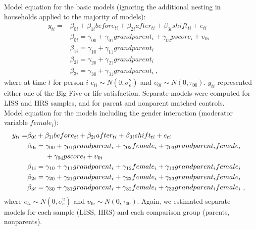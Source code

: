 \documentclass[
  english,
  man, noextraspace]{apa7}
\begin{document}
\begin{appendix}
Model equation for the basic models (ignoring the additional nesting in
households applied to the majority of models): \begin{equation}
\begin{split}
y_{ti} =& \beta_{0i} + \beta_{1i}before_{ti} + \beta_{2i}after_{ti} + \beta_{3i}shift_{ti} + e_{ti} \\
& \beta_{0i} = \gamma_{00} + \gamma_{01}grandparent_i + \gamma_{02}pscore_i + \upsilon_{0i} \\
& \beta_{1i} = \gamma_{10} + \gamma_{11}grandparent_i \\
& \beta_{2i} = \gamma_{20} + \gamma_{21}grandparent_i \\
& \beta_{3i} = \gamma_{30} + \gamma_{31}grandparent_i\ ,
\end{split}
\label{eq:mlm1}
\end{equation} where at time \(t\) for person \(i\)
\(e_{ti} \sim N(0, \sigma_e^2)\) and
\(\upsilon_{0i} \sim N(0, \tau_{00})\). \(y_{ti}\) represented either
one of the Big Five or life satisfaction. Separate models were computed
for LISS and HRS samples, and for parent and nonparent matched
controls.\\
Model equation for the models including the gender interaction
(moderator variable \(female_i\)): \begin{equation}
\begin{split}
y_{ti} =& \beta_{0i} + \beta_{1i}before_{ti} + \beta_{2i}after_{ti} + \beta_{3i}shift_{ti} + e_{ti} \\
& \beta_{0i} = \gamma_{00} + \gamma_{01}grandparent_i + \gamma_{02}female_i + \gamma_{03}grandparent_{i}female_{i} \\
& \hphantom{{}=\beta_{0i}}+ \gamma_{04}pscore_i + \upsilon_{0i} \\
& \beta_{1i} = \gamma_{10} + \gamma_{11}grandparent_i + \gamma_{12}female_i + \gamma_{13}grandparent_{i}female_{i} \\
& \beta_{2i} = \gamma_{20} + \gamma_{21}grandparent_i + \gamma_{22}female_i + \gamma_{23}grandparent_{i}female_{i} \\
& \beta_{3i} = \gamma_{30} + \gamma_{31}grandparent_i + \gamma_{32}female_i + \gamma_{33}grandparent_{i}female_{i}\ ,
\end{split}
\label{eq:mlm2}
\end{equation} where \(e_{ti} \sim N(0, \sigma_e^2)\) and
\(\upsilon_{0i} \sim N(0, \tau_{00})\). Again, we estimated separate
models for each sample (LISS, HRS) and each comparison group (parents,
nonparents).\\

\end{appendix}
\end{document}
